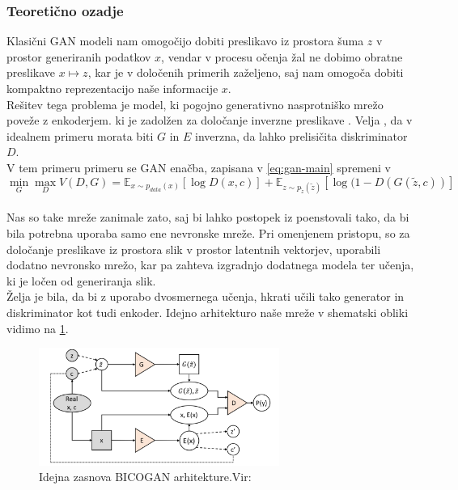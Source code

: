 \documentclass[12pt,a4paper,twoside]{article}
\theoremstyle{definition} %
\theoremstyle{plain} %
\numberwithin{equation}{section}  %
\begin{document}
\subsubsection{Teoretično ozadje}
Klasični GAN modeli nam omogočijo dobiti preslikavo iz prostora šuma $z$ v prostor generiranih podatkov $x$, vendar v procesu očenja žal ne dobimo obratne preslikave $x \mapsto z$, kar je v določenih primerih zaželjeno, saj nam omogoča dobiti kompaktno reprezentacijo naše informacije $x$. 
\\
Rešitev tega problema je model, ki  pogojno generativno nasprotniško mrežo poveže z enkoderjem. ki je zadolžen za določanje inverzne preslikave \cite{jaiswal2017bidirectional}. Velja \cite{donahue2016adversarial}, da v idealnem primeru morata biti $G$ in $E$ inverzna, da lahko prelisičita diskriminator $D$.
\\
V tem primeru primeru se GAN enačba, zapisana v \ref{eq:gan-main} spremeni v
$$ \min_{G}  \max_{D} V(D,G) = \mathbb{E}_{x \sim p_{data}(x)}[\log{D(x,c)}] + \mathbb{E}_{z \sim p_{\tilde{z}}(\tilde{z})}[\log{(1-D(G(\tilde{z},c))}]$$
\\
Nas so take mreže zanimale zato, saj bi lahko postopek iz \cite{antipov2017face} poenstovali tako, da bi bila potrebna uporaba samo ene nevronske mreže. Pri omenjenem pristopu, so za določanje preslikave iz prostora slik v prostor latentnih vektorjev, uporabili dodatno nevronsko mrežo, kar pa zahteva izgradnjo dodatnega modela ter učenja, ki je ločen od generiranja slik. 
\\
Želja je bila, da bi z uporabo dvosmernega učenja, hkrati učili tako generator in diskriminator kot tudi enkoder. 
Idejno arhitekturo naše mreže v shematski obliki vidimo na \ref{fig:bicogan-archi}. 
\begin{figure}[ht]
  \centering
  \includegraphics[width=0.7\textwidth]{images/bicogan_shema.png}
 \caption[Idejna zasnova BICOGAN arhitekture, vir: \cite{jaiswal2017bidirectional} ]{Idejna zasnova BICOGAN arhitekture.Vir:\cite{jaiswal2017bidirectional} }
  \label{fig:bicogan-archi}
\end{figure}
\end{document}
